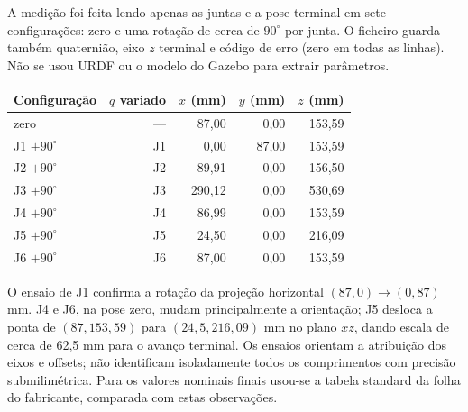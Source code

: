 A medição foi feita lendo apenas as juntas e a pose terminal em sete configurações: zero e uma rotação de cerca de $90^\circ$ por junta. O ficheiro guarda também quaternião, eixo $z$ terminal e código de erro (zero em todas as linhas). Não se usou URDF ou o modelo do Gazebo para extrair parâmetros.
\begin{center}\small
\begin{tabular}{@{}lrrrr@{}}\toprule
Configuração & $q$ variado & $x$ (mm) & $y$ (mm) & $z$ (mm)\\\midrule
zero & — & 87,00 & 0,00 & 153,59\\
J1 $+90^\circ$ & J1 & 0,00 & 87,00 & 153,59\\
J2 $+90^\circ$ & J2 & -89,91 & 0,00 & 156,50\\
J3 $+90^\circ$ & J3 & 290,12 & 0,00 & 530,69\\
J4 $+90^\circ$ & J4 & 86,99 & 0,00 & 153,59\\
J5 $+90^\circ$ & J5 & 24,50 & 0,00 & 216,09\\
J6 $+90^\circ$ & J6 & 87,00 & 0,00 & 153,59\\\bottomrule
\end{tabular}
\end{center}
O ensaio de J1 confirma a rotação da projeção horizontal $(87,0)\to(0,87)$ mm. J4 e J6, na pose zero, mudam principalmente a orientação; J5 desloca a ponta de $(87,153{,}59)$ para $(24{,}5,216{,}09)$ mm no plano $xz$, dando escala de cerca de 62,5 mm para o avanço terminal. Os ensaios orientam a atribuição dos eixos e offsets; não identificam isoladamente todos os comprimentos com precisão submilimétrica. Para os valores nominais finais usou-se a tabela standard da folha do fabricante, comparada com estas observações.

